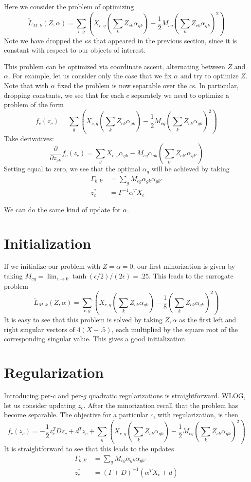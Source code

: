 \documentclass{article}
\begin{document}
Here we consider the problem of optimizing 
\[
\tilde L_{M,k}(Z,\alpha) = \sum_{c,g} \left(X_{c,g}\left(\sum_k Z_{ck} \alpha_{gk}\right) - \frac{1}{2}M_{cg}\left(\sum_k Z_{ck} \alpha_{gk}\right)^2 \right)
\]
Note we have dropped the $\kappa$s that appeared in the previous section, since it is constant with respect to our objects of interest.  

This problem can be optimized via coordinate ascent, alternating between $Z$ and $\alpha$.  For example, let us consider only the case that we fix $\alpha$ and try to optimize $Z$.  Note that with $\alpha$ fixed the problem is now separable over the $c$s.  In particular, dropping constants, we see that for each $c$ separately we need to optimize a problem of the form
\[
f_c(z_c) = \sum_{g} \left(X_{c,g}\left(\sum_k Z_{ck} \alpha_{gk}\right) - \frac{1}{2}M_{cg}\left(\sum_k Z_{ck} \alpha_{gk}\right)^2 \right)
\]
Take derivatives:
\[
\frac{\partial}{\partial z_{ck}}f_c(z_c) = \sum_{g} X_{c,g}\alpha_{gk} - M_{cg}\alpha_{gk}\left(\sum_{k'} Z_{ck'} \alpha_{gk'}\right) 
\]
Setting equal to zero, we see that the optimal $\alpha_g$ will be achieved by taking
\begin{align*}
\Gamma_{k,k'} &= \sum_g M_{cg}\alpha_{gk}\alpha_{gk'}\\
z_c^* &= \Gamma^{-1} \alpha^T X_c
\end{align*}

We can do the same kind of update for $\alpha$.

\section{Initialization}

If we initialize our problem with $Z=\alpha=0$, our first minorization is given by taking $M_{cg}=\lim_{\epsilon\rightarrow 0}\tanh(\epsilon/2)/(2\epsilon) = .25$.  This leads to the surrogate problem
\[
\tilde L_{M,k}(Z,\alpha) = \sum_{c,g} \left(X_{c,g}\left(\sum_k Z_{ck} \alpha_{gk}\right) - \frac{1}{8}\left(\sum_k Z_{ck} \alpha_{gk}\right)^2 \right)
\]
It is easy to see that this problem is solved by taking $Z,\alpha$ as the first left and right singular vectors of $4(X-.5)$, each multiplied by the square root of the corresponding singular value.  This gives a good initialization.

\section{Regularization}

Introducing per-$c$ and per-$g$ quadratic regularizations is straightforward.  WLOG, let us consider updating $z_c$.  After the minorization recall that the problem has become separable.  The objective for a particular $c$, with regularization, is then
\[
f_c(z_c) = -\frac{1}{2} z_c^T D z_c + d^Tz_c + \sum_{g} \left(X_{c,g}\left(\sum_k Z_{ck} \alpha_{gk}\right) - \frac{1}{2}M_{cg}\left(\sum_k Z_{ck} \alpha_{gk}\right)^2 \right)
\]
It is straightforward to see that this leads to the updates
\begin{align*}
\Gamma_{k,k'} &= \sum_g M_{cg}\alpha_{gk}\alpha_{gk'}\\
z_c^* &= (\Gamma+D)^{-1} (\alpha^T X_c+d)
\end{align*}
\end{document}
